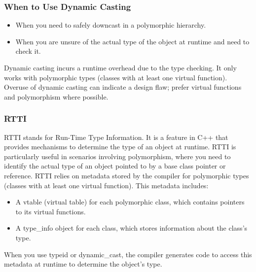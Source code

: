 \documentclass{report}
\begin{document}
    \subsubsection{When to Use Dynamic Casting}
    \bigbreak \noindent 
    \begin{itemize}
        \item When you need to safely downcast in a polymorphic hierarchy.
        \item When you are unsure of the actual type of the object at runtime and need to check it.
    \end{itemize}
    \bigbreak \noindent 
    Dynamic casting incurs a runtime overhead due to the type checking. It only works with polymorphic types (classes with at least one virtual function).
    \bigbreak \noindent 
    Overuse of dynamic casting can indicate a design flaw; prefer virtual functions and polymorphism where possible.

    \bigbreak \noindent 
    \subsubsection{RTTI}
    \bigbreak \noindent 
    RTTI stands for Run-Time Type Information. It is a feature in C++ that provides mechanisms to determine the type of an object at runtime. RTTI is particularly useful in scenarios involving polymorphism, where you need to identify the actual type of an object pointed to by a base class pointer or reference.
    \bigbreak \noindent 
    RTTI relies on metadata stored by the compiler for polymorphic types (classes with at least one virtual function). This metadata includes:
    \begin{itemize}
        \item A vtable (virtual table) for each polymorphic class, which contains pointers to its virtual functions.
        \item A type\_info object for each class, which stores information about the class's type.
    \end{itemize}
    \bigbreak \noindent 
    When you use typeid or dynamic\_cast, the compiler generates code to access this metadata at runtime to determine the object's type.

    \bigbreak \noindent 
\end{document}
